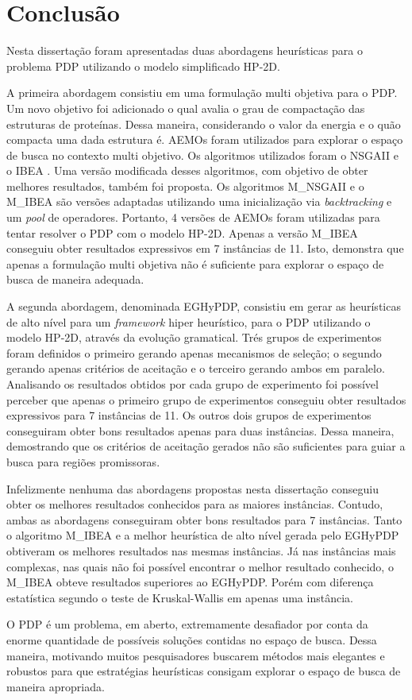 \chapter{Conclusão}
\label{cap:conclusao}


Nesta dissertação foram apresentadas duas abordagens heurísticas para o problema PDP utilizando o modelo simplificado HP-2D. 

A primeira abordagem consistiu em uma formulação multi objetiva para o PDP. Um novo objetivo foi adicionado o qual avalia o grau de compactação das estruturas de proteínas. Dessa maneira, considerando o valor da energia e o quão compacta uma dada estrutura é. AEMOs foram utilizados para explorar o espaço de busca no contexto multi objetivo. Os algoritmos utilizados foram o NSGAII \cite{deb2002} e o IBEA \cite{zitzler2004indicator}. Uma versão modificada desses algoritmos, com objetivo de obter melhores resultados, também foi proposta. Os algoritmos M\_NSGAII e o M\_IBEA são versões adaptadas utilizando uma inicialização via \textit{backtracking}  e um \textit{pool} de operadores. Portanto, 4 versões de AEMOs foram utilizadas para tentar resolver o PDP com o modelo HP-2D. Apenas a versão M\_IBEA conseguiu obter resultados expressivos em 7 instâncias de 11. Isto, demonstra que apenas a formulação multi objetiva não é suficiente para explorar o espaço de busca de maneira adequada.  


A segunda abordagem, denominada EGHyPDP, consistiu em gerar as heurísticas de alto nível para um \textit{framework} hiper heurístico, para o PDP utilizando o modelo HP-2D, através da evolução gramatical. Trés grupos de experimentos foram definidos o primeiro gerando apenas mecanismos de seleção; o segundo gerando apenas critérios de aceitação e o terceiro gerando ambos em paralelo. Analisando os resultados obtidos por cada grupo de experimento foi possível perceber que apenas o primeiro grupo de experimentos conseguiu obter resultados expressivos para 7 instâncias de 11. Os outros dois grupos de experimentos conseguiram obter bons resultados apenas para duas instâncias. Dessa maneira, demostrando que os critérios de aceitação gerados não são suficientes para guiar a busca para regiões promissoras. 

Infelizmente nenhuma das abordagens propostas nesta dissertação conseguiu obter os melhores resultados conhecidos para as maiores instâncias. Contudo, ambas as abordagens conseguiram obter bons resultados para 7 instâncias. Tanto o algoritmo M\_IBEA e a melhor heurística de alto nível gerada pelo EGHyPDP obtiveram os melhores resultados nas mesmas instâncias. Já nas instâncias mais complexas, nas quais não foi possível encontrar o melhor resultado conhecido, o M\_IBEA obteve resultados superiores ao EGHyPDP. Porém com diferença estatística segundo o teste de Kruskal-Wallis \cite{mckight2010kruskal} em apenas uma instância.

O PDP é um problema, em aberto,  extremamente desafiador por conta da enorme quantidade de possíveis soluções contidas no espaço de busca. Dessa maneira,  motivando muitos pesquisadores buscarem métodos mais elegantes e robustos para que estratégias heurísticas consigam explorar o espaço de busca de maneira apropriada.



